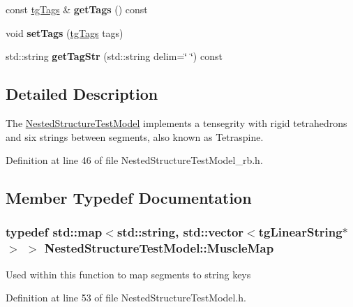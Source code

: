 \begin{DoxyCompactItemize}
\item 
\hypertarget{classtg_taggable_ae70d7d3b45301665bc363b0ed8b9b292}{const \hyperlink{classtg_tags}{tg\-Tags} \& {\bfseries get\-Tags} () const }\label{classtg_taggable_ae70d7d3b45301665bc363b0ed8b9b292}

\item 
\hypertarget{classtg_taggable_a5492888e4e4da4cca6261070b5726adf}{void {\bfseries set\-Tags} (\hyperlink{classtg_tags}{tg\-Tags} tags)}\label{classtg_taggable_a5492888e4e4da4cca6261070b5726adf}

\item 
\hypertarget{classtg_taggable_a346d66b066d2d9eb1eadba01da43749f}{std\-::string {\bfseries get\-Tag\-Str} (std\-::string delim=\char`\"{} \char`\"{}) const }\label{classtg_taggable_a346d66b066d2d9eb1eadba01da43749f}

\end{DoxyCompactItemize}


\subsection{Detailed Description}
The \hyperlink{class_nested_structure_test_model}{Nested\-Structure\-Test\-Model} implements a tensegrity with rigid tetrahedrons and six strings between segments, also known as Tetraspine. 

Definition at line 46 of file Nested\-Structure\-Test\-Model\-\_\-rb.\-h.



\subsection{Member Typedef Documentation}
\hypertarget{class_nested_structure_test_model_a257809d15eeffe9f7defed730478a9b0}{
\subsubsection[{Muscle\-Map}]{\setlength{\rightskip}{0pt plus 5cm}typedef std\-::map$<$std\-::string, std\-::vector$<${\bf tg\-Linear\-String}$\ast$$>$ $>$ {\bf Nested\-Structure\-Test\-Model\-::\-Muscle\-Map}}}\label{class_nested_structure_test_model_a257809d15eeffe9f7defed730478a9b0}
Used within this function to map segments to string keys 

Definition at line 53 of file Nested\-Structure\-Test\-Model.\-h.



